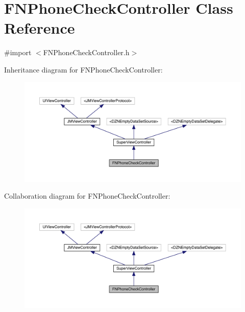\hypertarget{interface_f_n_phone_check_controller}{}\section{F\+N\+Phone\+Check\+Controller Class Reference}
\label{interface_f_n_phone_check_controller}


{\ttfamily \#import $<$F\+N\+Phone\+Check\+Controller.\+h$>$}



Inheritance diagram for F\+N\+Phone\+Check\+Controller\+:\nopagebreak
\begin{figure}[H]
\begin{center}
\leavevmode
\includegraphics[width=350pt]{interface_f_n_phone_check_controller__inherit__graph}
\end{center}
\end{figure}


Collaboration diagram for F\+N\+Phone\+Check\+Controller\+:\nopagebreak
\begin{figure}[H]
\begin{center}
\leavevmode
\includegraphics[width=350pt]{interface_f_n_phone_check_controller__coll__graph}
\end{center}
\end{figure}
